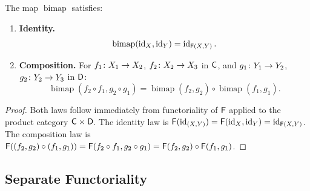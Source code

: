 \documentclass[../preamble]{subfiles}
\begin{document}
\begin{proposition}
  \label{prop:bimap-laws}
  The map $\operatorname{bimap}$ satisfies:
  \begin{enumerate}
    \item \textbf{Identity.}
      \begin{equation}
        \label{eq:bimap-id}
        \operatorname{bimap}(\operatorname{id}_X, \operatorname{id}_Y) = \operatorname{id}_{\mathsf{F}(X,Y)}.
      \end{equation}

    \item \textbf{Composition.}
      For $f_1 \colon X_1 \lto X_2$, $f_2 \colon X_2 \lto X_3$ in $\mathsf{C}$,
      and $g_1 \colon Y_1 \lto Y_2$, $g_2 \colon Y_2 \lto Y_3$ in $\mathsf{D}$:
      \begin{equation}
        \label{eq:bimap-comp}
        \operatorname{bimap}(f_2 \circ f_1, g_2 \circ g_1)
          = \operatorname{bimap}(f_2, g_2)
            \circ \operatorname{bimap}(f_1, g_1).
      \end{equation}
  \end{enumerate}
\end{proposition}

\begin{proof}
  Both laws follow immediately from functoriality of $\mathsf{F}$
  applied to the product category $\mathsf{C} \times \mathsf{D}$.
  The identity law is
  $\mathsf{F}(\operatorname{id}_{(X,Y)}) = \mathsf{F}(\operatorname{id}_X, \operatorname{id}_Y) = \operatorname{id}_{\mathsf{F}(X,Y)}$.
  The composition law is
  $\mathsf{F}((f_2, g_2) \circ (f_1, g_1))
    = \mathsf{F}(f_2 \circ f_1, g_2 \circ g_1)
    = \mathsf{F}(f_2, g_2) \circ \mathsf{F}(f_1, g_1)$.
\end{proof}

\subsection{Separate Functoriality}
\end{document}
